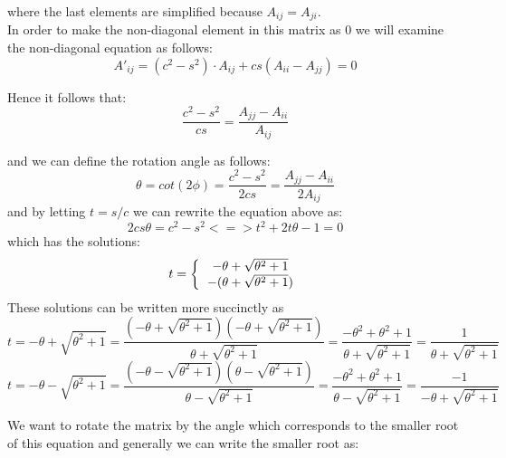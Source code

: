 \documentclass[12pt,twoside]{article}
\begin{document}
where the last elements are simplified because $A_{ij}=A_{ji}$.\\



In order to make the non-diagonal element in this matrix as 0 we will examine the non-diagonal equation as follows:
\begin{equation}
A'_{ij} = (c^2 - s^2) \cdot A_{ij} + cs(A_{ii}-A_{jj}) = 0
\end{equation}


Hence it follows that:
\begin{equation}
\frac{c^2-s^2}{cs} = \frac{A_{jj}-A_{ii}}{A_{ij}}
\end{equation}

and we can define the rotation angle as follows:
\begin{equation}
\theta = cot(2\phi) = \frac{c^2-s^2}{2cs} = \frac{A_{jj}-A_{ii}}{2A_{ij}}
\end{equation}
and by letting $t = s/c$ we can rewrite the equation above as:\\
\begin{equation}
2cs\theta = c^2 - s^2 <=>
t^2 + 2t\theta - 1 = 0
\end{equation}
which has the solutions:\\
\begin{equation}
t = 
\bigg\{
  \begin{tabular}{cc}
$ -\theta + \sqrt{\theta^2+1}$ \\
$ -(\theta + \sqrt{\theta^2+1})$ \\
  \end{tabular}
\end{equation}
These solutions can be written more succinctly as
\begin{equation}
t =  -\theta + \sqrt{\theta^2+1}  = \frac{ \left(-\theta + \sqrt{\theta^2+1}\right)\left(-\theta + \sqrt{\theta^2+1}\right) }{\theta + \sqrt{\theta^2+1}}
= \frac{ -\theta^2 + \theta^2 + 1 }{\theta + \sqrt{\theta^2+1}} = \frac{1}{\theta + \sqrt{\theta^2+1}}
\end{equation}
\begin{equation}
t =  -\theta - \sqrt{\theta^2+1}  = \frac{ \left(-\theta - \sqrt{\theta^2+1}\right)\left(\theta - \sqrt{\theta^2+1}\right) }{\theta - \sqrt{\theta^2+1}}
= \frac{ -\theta^2 + \theta^2 + 1 }{\theta - \sqrt{\theta^2+1}} = \frac{-1}{-\theta + \sqrt{\theta^2+1}}
\end{equation}

We want to rotate the matrix by the angle which corresponds to the smaller root of this equation and generally we can write the smaller root as:
\end{document}
